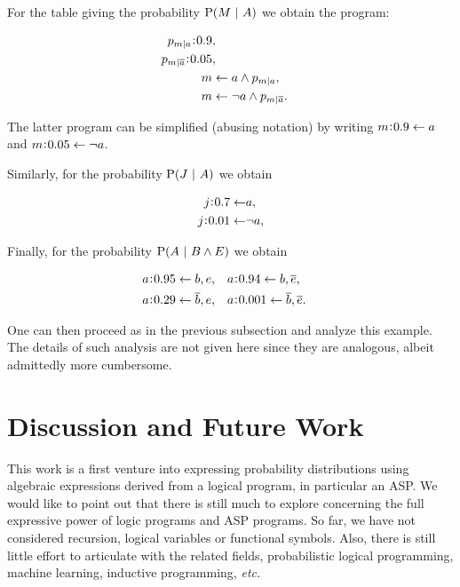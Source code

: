 \documentclass{llncs}
\newcommand{\at}[1]{\ensuremath{\!\del{#1}}}
\newcommand{\co}[1]{\ensuremath{\overline{#1}}}
\newcommand{\pr}[1]{\ensuremath{\mathrm{P}\at{#1}}}
\newcommand{\given}{\ensuremath{~\middle|~}}
\newcommand{\probfact}[2]{\ensuremath{#2\mkern-4mu:\mkern-4mu#1}}
\newcommand{\probrule}[3]{\probfact{#1}{#2} \leftarrow #3}
\newcommand{\condsymb}[2]{\ensuremath{p_{#1|#2}}}
\renewcommand{\note}[1]{
    \stepcounter{remark}%
    {\!\!\color{red}/}\footnotemark[\arabic{remark}]\!\!%
    \footnotetext[\arabic{remark}]{{\color{red}/}#1}
}
\begin{document}
For the table giving the probability $\pr{M \given A}$ we obtain the program:

\begin{equation*}
    \begin{aligned}
        \probfact{0.9}{\condsymb{m}{a}}       & ,\cr
        \probfact{0.05}{\condsymb{m}{\co{a}}} & ,\cr
        m                                     & \leftarrow a \wedge \condsymb{m}{a},\cr
        m                                     & \leftarrow \neg a \wedge \condsymb{m}{\co{a}}.
    \end{aligned}
\end{equation*}

The latter program can be simplified (abusing notation) by writing $\probrule{0.9}{m}{a}$ and $\probrule{0.05}{m}{\neg a}$.

Similarly, for the probability $\pr{J \given A}$ we obtain

\begin{equation*}
    \begin{aligned}
        \probrule{0.7}{j}{&a},      \\
        \probrule{0.01}{j}{&\neg a},
    \end{aligned}
\end{equation*}

Finally, for the probability $\pr{A \given B \wedge E}$ we obtain

\begin{equation*}
    \begin{aligned}
        \probrule{0.95}{a}{b, e},      &  &  &
        \probrule{0.94}{a}{b, \co{e}},\cr
        \probrule{0.29}{a}{\co{b}, e}, &  &  &
        \probrule{0.001}{a}{\co{b}, \co{e}}.
    \end{aligned}
\end{equation*}

One can then proceed as in the previous subsection and analyze this example. The details of such analysis are not given here since they are analogous, albeit admittedly more cumbersome.
%
%
%
\section{Discussion and Future Work}
%
%
%
This work is a first venture into expressing probability distributions using algebraic expressions derived from a logical program, in particular an \ac{ASP}.
We would like to point out that there is still much to explore concerning the full expressive power of logic programs and \ac{ASP} programs. So far, we have not considered recursion, logical variables or functional symbols. Also, there is still little effort to articulate with the  related fields, probabilistic logical programming, machine learning, inductive programming, \emph{etc.}
\end{document}
